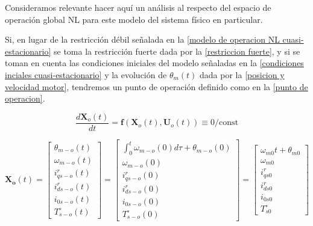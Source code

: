 \documentclass[a4paper, 10pt, onecolumn,journal]{ieeeconf}
\begin{document}
Consideramos relevante hacer aquí un análisis al respecto
del espacio de operación global NL para este modelo del sistema físico
en particular.

Si, en lugar de la restricción débil señalada en la \cref{modelo de operacion NL cuasi-estacionario}
se toma la restricción fuerte dada por la \cref{restriccion fuerte}, y si se toman en cuenta
las condiciones iniciales del modelo señaladas en la \cref{condiciones inciales cuasi-estacionario} y 
la evolución de $\theta_m(t)$ dada por la \cref{posicion y velocidad motor}, tendremos un
punto de operación definido como en la \cref{punto de operacion}.


\begin{equation}
    \frac{d\mathbf{X}_o(t)}{dt} =  \mathbf{f}(\mathbf{X}_o(t), \mathbf{U}_o(t)) \equiv 0/\text{const}
    \label{restriccion fuerte}
\end{equation}

\begin{equation}
    \mathbf{X_o}(t)
    =
    \begin{bmatrix} 
        \theta_{m-o}(t) \\ 
        \omega_{m-o}(t) \\ 
        i^r_{qs-o}(t) \\ 
        i^r_{ds-o}(t)\\ 
        i_{0s-o}(t)\\ 
        T^\circ_{s-o}(t)
    \end{bmatrix}
    =
    \begin{bmatrix} 
        \int_{0}^{t} \omega_{m-o}(0) d\tau + \theta_{m-o}(0)\\
        \omega_{m-o}(0)\\
        i^r_{qs-o}(0) \\
        i^r_{ds-o}(0)\\
        i_{0s-o}(0)\\
        T^\circ_{s-o}(0)
    \end{bmatrix}
    =
    \begin{bmatrix} 
        \omega_{m0}t + \theta_{m0}\\
        \omega_{m0} \\ 
        i^r_{qs0} \\ 
        i^r_{ds0} \\ 
        i_{0s0} \\ 
        T^\circ_{s0} 
    \end{bmatrix}
    \label{punto de operacion}
\end{equation}
\end{document}
